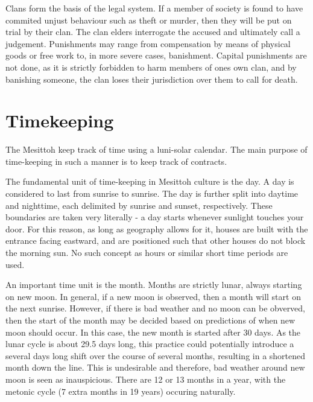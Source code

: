 \documentclass[paper=6in:9in, fontsize=10.5]{scrbook}
\makeatletter
\renewcommand\paragraph{\@startsection{paragraph}{4}{\z@}{\parskip}{-1em}{\normalfont\normalsize\bfseries}}
\newcommand{\ý}{ɨ́}
\makeatother
\begin{document}
Clans form the basis of the legal system. If a member of society is found to have commited unjust behaviour such as theft or murder, then they will be put on trial by their clan. The clan elders interrogate the accused and ultimately call a judgement. Punishments may range from compensation by means of physical goods or free work to, in more severe cases, banishment. Capital punishments are not done, as it is strictly forbidden to harm members of ones own clan, and by banishing someone, the clan loses their jurisdiction over them to call for death.

\section{Timekeeping}
The Mesittoh keep track of time using a luni-solar calendar. The main purpose of time-keeping in such a manner is to keep track of contracts.

\paragraph{The Day} The fundamental unit of time-keeping in Mesittoh culture is the day. A day is considered to last from sunrise to sunrise. The day is further split into daytime and nighttime, each delimited by sunrise and sunset, respectively. These boundaries are taken very literally - a day starts whenever sunlight touches your door. For this reason, as long as geography allows for it, houses are built with the entrance facing eastward, and are positioned such that other houses do not block the morning sun. No such concept as hours or similar short time periods are used.

\paragraph{The Month} An important time unit is the month. Months are strictly lunar, always starting on new moon. In general, if a new moon is observed, then a month will start on the next sunrise. However, if there is bad weather and no moon can be obverved, then the start of the month may be decided based on predictions of when new moon should occur. In this case, the new month is started after 30 days. As the lunar cycle is about 29.5 days long, this practice could potentially introduce a several days long shift over the course of several months, resulting in a shortened month down the line. This is undesirable and therefore, bad weather around new moon is seen as inauspicious. There are 12 or 13 months in a year, with the metonic cycle (7 extra months in 19 years) occuring naturally. 
\end{document}
